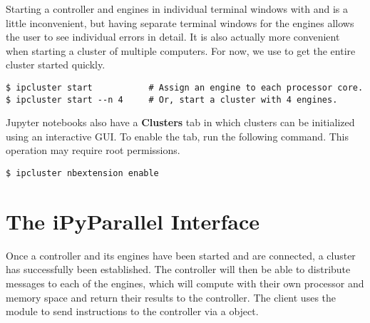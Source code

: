 Starting a controller and engines in individual terminal windows with  and  is a little inconvenient, but having separate terminal windows for the engines allows the user to see individual errors in detail.
It is also actually more convenient when starting a cluster of multiple computers.
For now, we use  to get the entire cluster started quickly.

\begin{lstlisting}
$ ipcluster start           # Assign an engine to each processor core.
$ ipcluster start --n 4     # Or, start a cluster with 4 engines.
\end{lstlisting}


\begin{info}
Jupyter notebooks also have a \textbf{Clusters} tab in which clusters can be initialized using an interactive GUI.
To enable the tab, run the following command.
This operation may require root permissions.
\begin{lstlisting}[style=ShellInput]
$ ipcluster nbextension enable
\end{lstlisting}
\end{info}

\section*{The iPyParallel Interface} %

Once a controller and its engines have been started and are connected, a cluster has successfully been established.
The controller will then be able to distribute messages to each of the engines, which will compute with their own processor and memory space and return their results to the controller.
The client uses the  module to send instructions to the controller via a  object.

%

